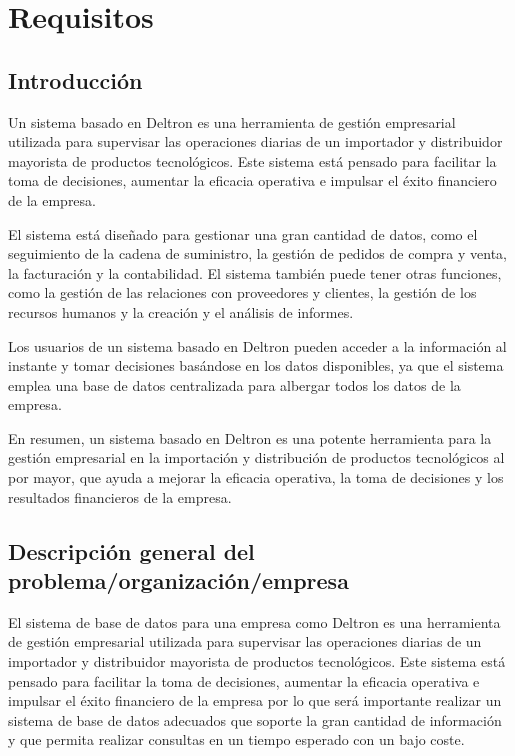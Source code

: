 \documentclass[10pt, a4paper,openany]{report}
\begin{document}

\maketitle
\tableofcontents
\chapter{Requisitos}
\label{cap:Requisitos}


\section{Introducción}
\label{sec:Introducción}

Un sistema basado en Deltron es una herramienta de gestión empresarial utilizada para supervisar las operaciones diarias de un importador y distribuidor mayorista de productos tecnológicos. Este sistema está pensado para facilitar la toma de decisiones, aumentar la eficacia operativa e impulsar el éxito financiero de la empresa.

El sistema está diseñado para gestionar una gran cantidad de datos, como el seguimiento de la cadena de suministro, la gestión de pedidos de compra y venta, la facturación y la contabilidad. El sistema también puede tener otras funciones, como la gestión de las relaciones con proveedores y clientes, la gestión de los recursos humanos y la creación y el análisis de informes.

Los usuarios de un sistema basado en Deltron pueden acceder a la información al instante y tomar decisiones basándose en los datos disponibles, ya que el sistema emplea una base de datos centralizada para albergar todos los datos de la empresa.

En resumen, un sistema basado en Deltron es una potente herramienta para la gestión empresarial en la importación y distribución de productos tecnológicos al por mayor, que ayuda a mejorar la eficacia operativa, la toma de decisiones y los resultados financieros de la empresa.


\section{Descripción general del problema/organización/empresa}
\label{sec:Descripción general del problema/organización/empresa}

El sistema de base de datos para una empresa como Deltron es una herramienta de gestión empresarial utilizada para supervisar las operaciones diarias de un importador y distribuidor mayorista de productos tecnológicos. Este sistema está pensado para facilitar la toma de decisiones, aumentar la eficacia operativa e impulsar el éxito financiero de la empresa por lo que será importante realizar un sistema de base de datos adecuados que soporte la gran cantidad de información y que permita realizar consultas en un tiempo esperado con un bajo coste.
\end{document}
